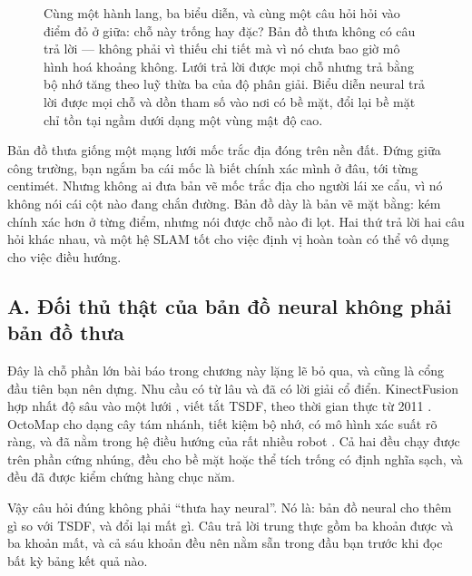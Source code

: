 \documentclass[../../deep_learning.tex]{subfiles}
\begin{document}
\begin{figure}[H]
{}
\caption{Cùng một hành lang, ba biểu diễn, và cùng một câu hỏi hỏi vào điểm đỏ ở giữa: chỗ này trống hay đặc? Bản đồ thưa không có câu trả lời --- không phải vì thiếu chi tiết mà vì nó chưa bao giờ mô hình hoá khoảng không. Lưới trả lời được mọi chỗ nhưng trả bằng bộ nhớ tăng theo luỹ thừa ba của độ phân giải. Biểu diễn neural trả lời được mọi chỗ và dồn tham số vào nơi có bề mặt, đổi lại bề mặt chỉ tồn tại ngầm dưới dạng một vùng mật độ cao.}
\label{fig:map-repr-query}
\end{figure}

\begin{trucgiac}
Bản đồ thưa giống một mạng lưới mốc trắc địa đóng trên nền đất. Đứng giữa công trường, bạn ngắm ba cái mốc là biết chính xác mình ở đâu, tới từng centimét. Nhưng không ai đưa bản vẽ mốc trắc địa cho người lái xe cẩu, vì nó không nói cái cột nào đang chắn đường. Bản đồ dày là bản vẽ mặt bằng: kém chính xác hơn ở từng điểm, nhưng nói được chỗ nào đi lọt. Hai thứ trả lời hai câu hỏi khác nhau, và một hệ SLAM tốt cho việc định vị hoàn toàn có thể vô dụng cho việc điều hướng.
\end{trucgiac}

\subsection{A. Đối thủ thật của bản đồ neural không phải bản đồ thưa}
Đây là chỗ phần lớn bài báo trong chương này lặng lẽ bỏ qua, và cũng là cổng đầu tiên bạn nên dựng. Nhu cầu  có từ lâu và đã có lời giải cổ điển. KinectFusion hợp nhất độ sâu vào một lưới , viết tắt TSDF, theo thời gian thực từ 2011 \cite{f32kinectfusion2011}. OctoMap cho  dạng cây tám nhánh, tiết kiệm bộ nhớ, có mô hình xác suất rõ ràng, và đã nằm trong hệ điều hướng của rất nhiều robot \cite{f32octomap2013}. Cả hai đều chạy được trên phần cứng nhúng, đều cho bề mặt hoặc thể tích trống có định nghĩa sạch, và đều đã được kiểm chứng hàng chục năm.

Vậy câu hỏi đúng không phải ``thưa hay neural''. Nó là: bản đồ neural cho thêm gì so với TSDF, và đổi lại mất gì. Câu trả lời trung thực gồm ba khoản được và ba khoản mất, và cả sáu khoản đều nên nằm sẵn trong đầu bạn trước khi đọc bất kỳ bảng kết quả nào.
\end{document}
